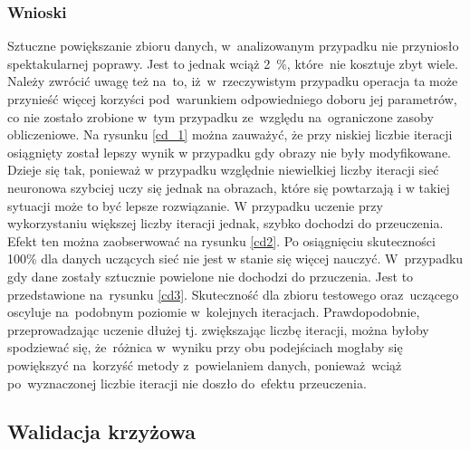 \subsubsection{Wnioski}
Sztuczne powiększanie zbioru danych, w~analizowanym przypadku nie przyniosło spektakularnej poprawy. Jest to jednak wciąż 2~\%, które~nie kosztuje zbyt wiele. Należy zwrócić uwagę też na~to, iż~w~rzeczywistym przypadku operacja ta może przynieść więcej korzyści pod~warunkiem odpowiedniego doboru jej parametrów, co nie zostało zrobione w~tym przypadku ze~względu na~ograniczone zasoby obliczeniowe. Na rysunku \ref{cd_1} można zauważyć, że przy niskiej liczbie iteracji osiągnięty został lepszy wynik w przypadku gdy obrazy nie były modyfikowane. Dzieje się tak, ponieważ w przypadku względnie niewielkiej liczby iteracji sieć neuronowa szybciej uczy się jednak na obrazach, które się powtarzają i w takiej sytuacji może to być lepsze rozwiązanie.  W przypadku uczenie przy wykorzystaniu większej liczby iteracji jednak, szybko dochodzi do przeuczenia. Efekt ten można zaobserwować na rysunku \ref{cd2}. Po osiągnięciu skuteczności 100\% dla danych uczących sieć nie jest w stanie się więcej nauczyć. W~przypadku gdy dane zostały sztucznie powielone nie dochodzi do przuczenia. Jest to przedstawione na~rysunku \ref{cd3}. Skuteczność dla zbioru testowego oraz~uczącego oscyluje na~podobnym poziomie w~kolejnych iteracjach. Prawdopodobnie, przeprowadzając uczenie dłużej tj. zwiększając liczbę iteracji, można byłoby spodziewać się, że~różnica w~wyniku przy obu podejściach mogłaby się powiększyć na~korzyść metody z~powielaniem danych, ponieważ~wciąż po~wyznaczonej liczbie iteracji nie doszło do~efektu przeuczenia.

\subsection{Walidacja krzyżowa}\label{cvChapter}
